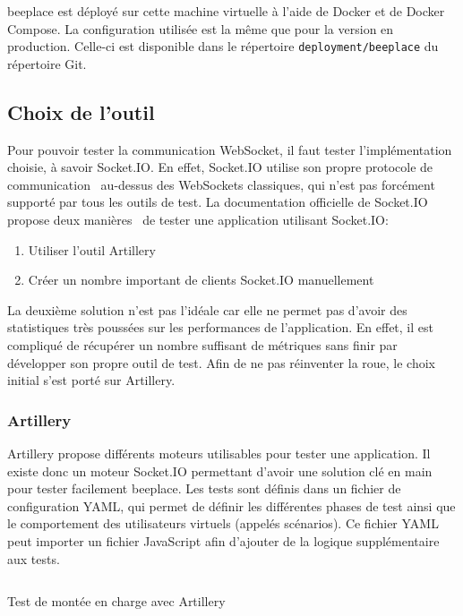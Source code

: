 \gls{beeplace} est déployé sur cette machine virtuelle à l'aide de Docker et de Docker Compose. La configuration utilisée est la même que pour la version en production. Celle-ci est disponible dans le répertoire \texttt{deployment/beeplace} du répertoire Git.

\subsection{Choix de l'outil}

Pour pouvoir tester la communication WebSocket, il faut tester l'implémentation choisie, à savoir Socket.IO. En effet, Socket.IO utilise son propre protocole de communication~\cite{socket-io-protocol} au-dessus des WebSockets classiques, qui n'est pas forcément supporté par tous les outils de test. La documentation officielle de Socket.IO propose deux manières~\cite{socket-io-load-testing} de tester une application utilisant Socket.IO:

\begin{enumerate}
  \item Utiliser l'outil Artillery~\cite{artillery}
  \item Créer un nombre important de clients Socket.IO manuellement
\end{enumerate}

La deuxième solution n'est pas l'idéale car elle ne permet pas d'avoir des statistiques très poussées sur les performances de l'application. En effet, il est compliqué de récupérer un nombre suffisant de métriques sans finir par développer son propre outil de test. Afin de ne pas réinventer la roue, le choix initial s'est porté sur Artillery.

\subsubsection{Artillery}

Artillery propose différents moteurs utilisables pour tester une application. Il existe donc un moteur Socket.IO permettant d'avoir une solution clé en main pour tester facilement \gls{beeplace}. Les tests sont définis dans un fichier de configuration YAML, qui permet de définir les différentes phases de test ainsi que le comportement des utilisateurs virtuels (appelés scénarios). Ce fichier YAML peut importer un fichier JavaScript afin d'ajouter de la logique supplémentaire aux tests.

\begin{listing}[h]
  \inputminted[linenos]{yaml}{assets/figures/artillery-test.yml}
  \caption{Test de montée en charge avec Artillery}
  \label{listing:artillery}
\end{listing}

